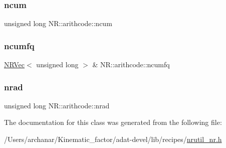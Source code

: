 \mbox{\label{classNR_1_1arithcode_a942d481da12f999dd8a6a6cdf701eb13}} 
\subsubsection{\texorpdfstring{ncum}{ncum}}
{\footnotesize\ttfamily unsigned long N\+R\+::arithcode\+::ncum}

\mbox{\label{classNR_1_1arithcode_ab42f8b311dc85df156a07c70ce179a59}} 
\subsubsection{\texorpdfstring{ncumfq}{ncumfq}}
{\footnotesize\ttfamily \mbox{\hyperlink{classNR_1_1NRVec}{N\+R\+Vec}}$<$ unsigned long $>$ \& N\+R\+::arithcode\+::ncumfq}

\mbox{\label{classNR_1_1arithcode_a5f878b2a52dbcbd16e23593f6510959c}} 
\subsubsection{\texorpdfstring{nrad}{nrad}}
{\footnotesize\ttfamily unsigned long N\+R\+::arithcode\+::nrad}



The documentation for this class was generated from the following file\+:\begin{DoxyCompactItemize}
\item 
/\+Users/archanar/\+Kinematic\+\_\+factor/adat-\/devel/lib/recipes/\mbox{\hyperlink{adat-devel_2lib_2recipes_2nrutil__nr_8h}{nrutil\+\_\+nr.\+h}}\end{DoxyCompactItemize}
